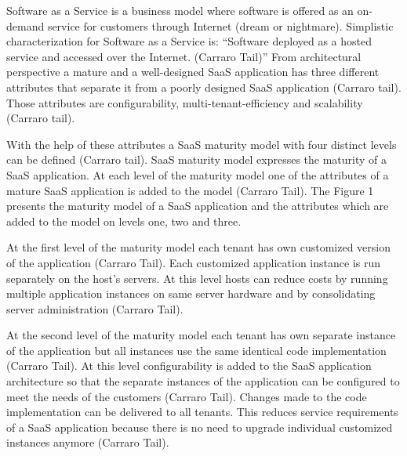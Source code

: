 \documentclass[conference]{sasmoota2017}
\begin{document}
%


Software as a Service is a business model where software is offered as an on-demand service for customers through Internet (dream or nightmare). Simplistic characterization for Software as a Service is: “Software deployed as a hosted service and accessed over the Internet. (Carraro Tail)” From architectural perspective a mature and a well-designed SaaS application has three different attributes that separate it from a poorly designed SaaS application (Carraro tail). Those attributes are configurability, multi-tenant-efficiency and scalability (Carraro tail).

With the help of these attributes a SaaS maturity model with four distinct levels can be defined (Carraro tail). SaaS maturity model expresses the maturity of a SaaS application. At each level of the maturity model one of the attributes of a mature SaaS application is added to the model (Carraro Tail). The Figure 1 presents the maturity model of a SaaS application and the attributes which are added to the model on levels one, two and three. 

At the first level of the maturity model each tenant has own customized version of the application (Carraro Tail). Each customized application instance is run separately on the host’s servers. At this level hosts can reduce costs by running multiple application instances on same server hardware and by consolidating server administration (Carraro Tail). 

At the second level of the maturity model each tenant has own separate instance of the application but all instances use the same identical code implementation (Carraro Tail). At this level configurability is added to the SaaS application architecture so that the separate instances of the application can be configured to meet the needs of the customers (Carraro Tail). Changes made to the code implementation can be delivered to all tenants. This reduces service requirements of a SaaS application because there is no need to upgrade individual customized instances anymore (Carraro Tail).
\end{document}
